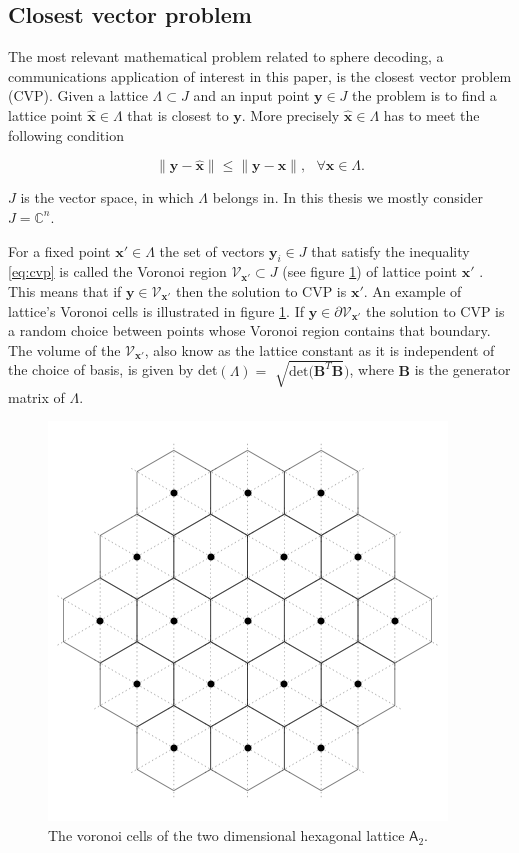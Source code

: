 \documentclass[english,12pt,a4paper,pdftex,sci,utf8]{aaltothesis}
\begin{document}
\subsection{Closest vector problem}

The most relevant mathematical problem related to sphere decoding, a communications application of interest in this paper, is the closest vector problem (CVP). Given a lattice $\Lambda \subset J$ and an input point $\mathbf{y} \in J$ the problem is to find a lattice point $\hat{\mathbf{x}} \in \Lambda$ that is closest to $\mathbf{y}$. More precisely $\hat{\mathbf{x}} \in \Lambda$ has to meet the following condition

\begin{equation}
\|\mathbf{y}-\hat{\mathbf{x}}\| \leq \|\mathbf{y}-\mathbf{x}\|, \ \ \ \forall \mathbf{x} \in \Lambda.
\label{eq:cvp}
\end{equation}

\noindent$J$ is the vector space, in which $\Lambda$ belongs in. In this thesis we mostly consider $J=\mathbb{C}^n$. 
\par For a fixed point $\mathbf{x}' \in \Lambda$ the set of vectors $\mathbf{y}_i \in J$ that satisfy the inequality \eqref{eq:cvp} is called the Voronoi region $\mathcal{V}_{\mathbf{x}'} \subset J$ (see figure \ref{fig:voronoi}) of lattice point $\mathbf{x}'$ \cite{zamir}. This means that if $\mathbf{y} \in \mathcal{V}_{\mathbf{x}'}$ then the solution to CVP is $\mathbf{x}'$. An example of lattice's Voronoi cells is illustrated in figure \ref{fig:voronoi}. If $\mathbf{y} \in \partial\mathcal{V}_{\mathbf{x}'}$ the solution to CVP is a random choice between points whose Voronoi region contains that boundary. The volume of the $\mathcal{V}_{\mathbf{x}'}$, also know as the lattice constant as it is independent of the choice of basis, is given by det$(\Lambda) = $ $\sqrt{\text{det}(\mathbf{B}^T\mathbf{B}})$, where $\mathbf{B}$ is the generator matrix of $\Lambda$. 

\begin{figure}[ht]
  \centering
  \includegraphics[width=0.5\linewidth]{voronoi_cells}
  \caption{The voronoi cells of the two dimensional hexagonal lattice $\mathsf{A}_2$.}
  \label{fig:voronoi}
\end{figure}
\end{document}

